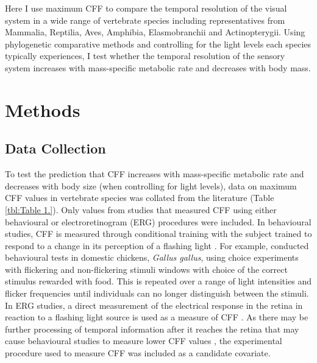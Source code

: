 Here I use maximum CFF to compare the temporal resolution of the visual system in a wide range of vertebrate species including representatives from Mammalia, Reptilia, Aves, Amphibia, Elasmobranchii and Actinopterygii. Using phylogenetic comparative methods and controlling for the light levels each species typically experiences, I test whether the temporal resolution of the sensory system increases with mass-specific metabolic rate and decreases with body mass.

\section{Methods}
\subsection{Data Collection}
To test the prediction that CFF increases with mass-specific metabolic rate and decreases with body size (when controlling for light levels), data on maximum CFF values in vertebrate species was collated from the literature (Table \ref{tbl:Table 1.}). Only values from studies that measured CFF using either behavioural or electroretinogram (ERG) procedures were included. In behavioural studies, CFF is measured through conditional training with the subject trained to respond to a change in its perception of a flashing light \citep{d1998can,rubene2010presence}. For example, \cite{lisney2011behavioural} conducted behavioural tests in domestic chickens, \textit{Gallus gallus}, using choice experiments with flickering and non-flickering stimuli windows with choice of the correct stimulus rewarded with food. This is repeated over a range of light intensities and flicker frequencies until individuals can no longer distinguish between the stimuli. In ERG studies, a direct measurement of the electrical response in the retina in reaction to a flashing light source is used as a measure of CFF \citep{d1998can,schwartz2010visual}. As there may be further processing of temporal information after it reaches the retina that may cause behavioural studies to measure lower CFF values \citep{d1998can}, the experimental procedure used to measure CFF was included as a candidate covariate. 

